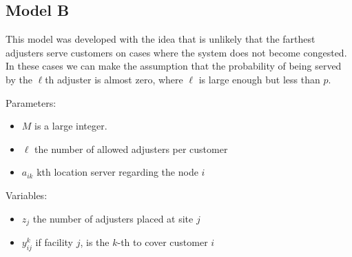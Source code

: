 
\subsection{Model B}
  
\begin{frame}
  This model was developed with the idea that is unlikely that
  the farthest adjusters serve customers on cases where the system does not become congested.
  In these cases we can make the assumption that the probability of being served by the $\ell$th 
  adjuster is almost zero, where $\ell$ is large enough but less than $p$.

  Parameters:
  \begin{itemize}
  \item $M$ is a large integer.
  \item $\ell$ the number of allowed adjusters per customer
  \item $a_{ik}$ kth location server regarding the node $i$
  \end{itemize}

  Variables:
  \begin{itemize}
  \item $z_j$ the number of adjusters placed at site $j$
  \item $y_{ij}^k$ if facility $j$, is the $k$-th to cover customer $i$
  \end{itemize}

\end{frame}

